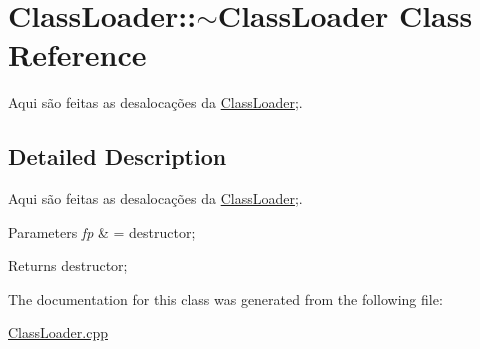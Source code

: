 \hypertarget{class_class_loader_1_1~_class_loader}{}\section{Class\+Loader\+:\+:$\sim$\+Class\+Loader Class Reference}
\label{class_class_loader_1_1~_class_loader}


Aqui são feitas as desalocações da \hyperlink{class_class_loader_1_1_class_loader}{Class\+Loader};.  




\subsection{Detailed Description}
Aqui são feitas as desalocações da \hyperlink{class_class_loader_1_1_class_loader}{Class\+Loader};. 


\begin{DoxyParams}{Parameters}
{\em fp} & = destructor; \\
\hline
\end{DoxyParams}
\begin{DoxyReturn}{Returns}
destructor; 
\end{DoxyReturn}


The documentation for this class was generated from the following file\+:\begin{DoxyCompactItemize}
\item 
\hyperlink{_class_loader_8cpp}{Class\+Loader.\+cpp}\end{DoxyCompactItemize}
